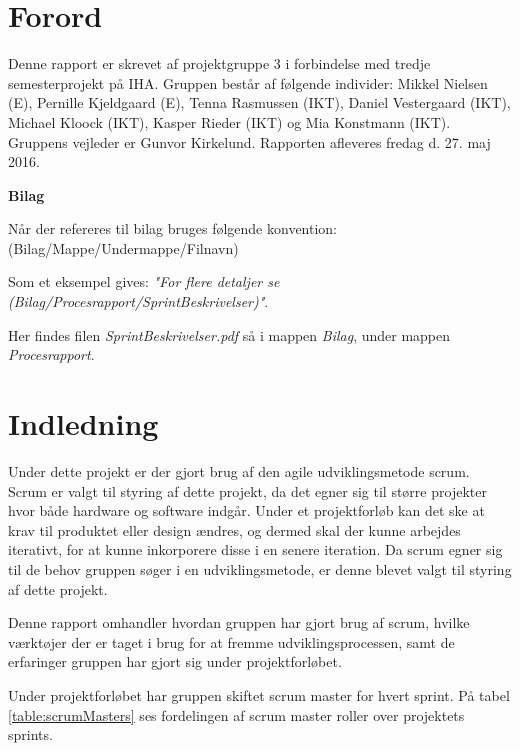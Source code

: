 \chapter{Forord}
Denne rapport er skrevet af projektgruppe 3 i forbindelse med tredje semesterprojekt på IHA. Gruppen består af følgende individer: Mikkel Nielsen (E), Pernille Kjeldgaard (E), Tenna Rasmussen (IKT), Daniel Vestergaard (IKT), Michael Kloock (IKT), Kasper Rieder (IKT) og Mia Konstmann (IKT). Gruppens vejleder er Gunvor Kirkelund. Rapporten afleveres fredag d. 27. maj 2016. \newline

\noindent \textbf{Bilag} \newline

\noindent Når der refereres til bilag bruges følgende konvention: \newline
\noindent (Bilag/Mappe/Undermappe/Filnavn) \newline

\noindent Som et eksempel gives: \newline
\noindent \textit{"For flere detaljer se (Bilag/Procesrapport/SprintBeskrivelser)"}. \newline

\noindent Her findes filen \textit{SprintBeskrivelser.pdf} så i mappen \textit{Bilag}, under mappen \textit{Procesrapport}.

\chapter{Indledning}
Under dette projekt er der gjort brug af den agile udviklingsmetode scrum\cite{scrumGuides}. Scrum er valgt til styring af dette projekt, da det egner sig til større projekter hvor både hardware og software indgår. Under et projektforløb kan det ske at krav til produktet eller design ændres, og dermed skal der kunne arbejdes iterativt, for at kunne inkorporere disse i en senere iteration. Da scrum egner sig til de behov gruppen søger i en udviklingsmetode, er denne blevet valgt til styring af dette projekt. \newline

\noindent Denne rapport omhandler hvordan gruppen har gjort brug af scrum, hvilke værktøjer der er taget i brug for at fremme udviklingsprocessen, samt de erfaringer gruppen har gjort sig under projektforløbet. \newline

\noindent Under projektforløbet har gruppen skiftet scrum master for hvert sprint. På tabel \ref{table:scrumMasters} ses fordelingen af scrum master roller over projektets sprints.

